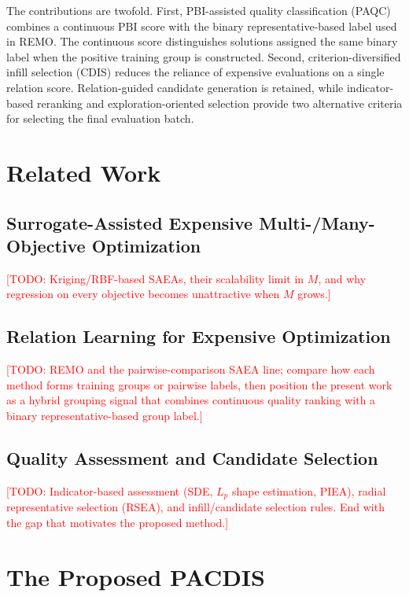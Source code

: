 \documentclass[final,5p,times,twocolumn]{elsarticle}
\newcommand{\TODO}[1]{\textcolor{red}{[TODO: #1]}}
\begin{document}
The contributions are twofold. First, PBI-assisted quality classification
(PAQC) combines a continuous PBI score with the binary representative-based
label used in REMO. The continuous score distinguishes solutions assigned the
same binary label when the positive training group is constructed. Second,
criterion-diversified infill selection (CDIS) reduces the reliance of expensive
evaluations on a single relation score. Relation-guided candidate generation is
retained, while indicator-based reranking and exploration-oriented selection
provide two alternative criteria for selecting the final evaluation batch.

\section{Related Work}
\label{sec:related}

\subsection{Surrogate-Assisted Expensive Multi-/Many-Objective Optimization}
\label{sec:related:saea}
\TODO{Kriging/RBF-based SAEAs, their scalability limit in $M$, and why
regression on every objective becomes unattractive when $M$ grows.}

\subsection{Relation Learning for Expensive Optimization}
\label{sec:related:relation}
\TODO{REMO and the pairwise-comparison SAEA line; compare how each method forms
training groups or pairwise labels, then position the present work as a hybrid
grouping signal that combines continuous quality ranking with a binary
representative-based group label.}

\subsection{Quality Assessment and Candidate Selection}
\label{sec:related:selection}
\TODO{Indicator-based assessment (SDE, $L_p$ shape estimation, PIEA), radial
representative selection (RSEA), and infill/candidate selection rules. End with
the gap that motivates the proposed method.}

\section{The Proposed PACDIS}
\label{sec:method}
\end{document}

